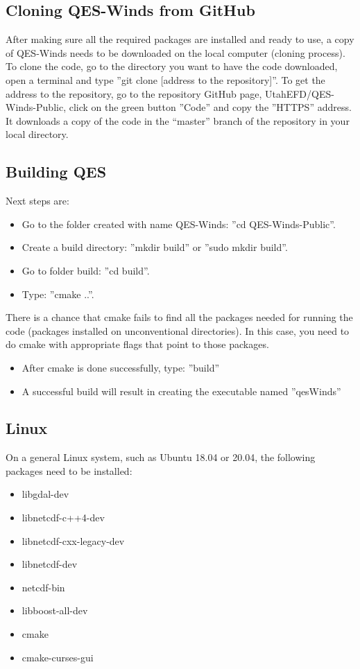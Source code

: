 \subsection{Cloning QES-Winds from GitHub}

After making sure all the required packages are installed and ready to use, a copy of QES-Winds needs to be downloaded on the local computer (cloning process). To clone the code, go to the directory you want to have the code downloaded, open a terminal and type ''git clone [address to the repository]''. To get the address to the repository, go to the repository GitHub page, UtahEFD/QES-Winds-Public, click on the green button ''Code'' and copy the ''HTTPS'' address. It downloads a copy of the code in the “master” branch of the repository in your local directory.

\subsection{Building QES}

Next steps are:
\begin{itemize}
    \item Go to the folder created with name QES-Winds: ''cd QES-Winds-Public''.
    \item Create a build directory: ''mkdir build'' or ''sudo mkdir build''.
    \item Go to folder build: ''cd build''.
    \item Type: ''cmake ..''.
\end{itemize}

There is a chance that cmake fails to find all the packages needed for running the code (packages installed on unconventional directories). In this case, you need to do cmake with appropriate flags that point to those packages.

\begin{itemize}
    \item After cmake is done successfully, type: ''build''
    \item A successful build will result in creating the executable named ''qesWinds''
\end{itemize}

\subsection{Linux}
On a general Linux system, such as Ubuntu 18.04 or 20.04, the following packages need to be installed:
\begin{itemize}
\item libgdal-dev
\item libnetcdf-c++4-dev
\item libnetcdf-cxx-legacy-dev
\item libnetcdf-dev
\item netcdf-bin
\item libboost-all-dev
\item cmake
\item cmake-curses-gui
\end{itemize}

